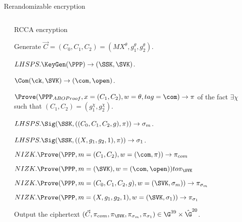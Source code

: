 \begin{frame}{Rerandomizable encryption}
\begin{columns}
\begin{column}{0.5\textwidth}
    \end{column}

    \begin{column}{0.5\textwidth}
      \tiny
      RCCA encryption 
      \begin{itemize}
      \item Generate $\vec{C} = (C_0, C_1, C_2) = (MX^{\theta}, g_1^{\theta},  g_2^{\theta})$.
      \item $LHSPS.\KeyGen(\PPP) \to (\SSK, \SVK)$.
      \item $\Com(\ck, \SVK) \to (\com, \open)$.
      \item $\Prove(\PPP_{ABOProof}, x = (C_1, C_2), w = \theta, tag = \com) \to \pi$ of the fact $\exists \chi$ such that $(C_1, C_2) = (g_1^\chi, g_2^\chi)$.
      \item {\color{red}$LHSPS.\Sig(\SSK,((C_0,C_1,C_2, g),\pi)) \to \sigma_m$.}
      \item {\color{red}$LHSPS.\Sig(\SSK,((X,g_1,g_2, 1),\pi)) \to \sigma_1$.}
        {\color{blue}
        \item $NIZK.\Prove(\PPP, m = (C_1, C_2), w = (\com,\pi)) \to \pi_{com}$
        \item $NIZK.\Prove(\PPP, m = (\SVK), w = (\com, \open)) to \pi_{\SVK}$
        \item $NIZK.\Prove(\PPP, m = (C_0,C_1,C_2,g), w = (\SVK, \sigma_m)) \to \pi_{\sigma_m}$
        \item $NIZK.\Prove(\PPP, m = (X,g_1,g_2,1), w = (\SVK, \sigma_1)) \to \pi_{\sigma_1}$
        }
        
      \item Output the ciphertext $(\vec{C},\pi_{com},\pi_{\SVK}, \pi_{\sigma_m}, \pi_{\sigma_1}) \in \G^{39} \times \hat{\G}^{20}$.
      \end{itemize}
 
    \end{column}
  \end{columns}
\end{frame}
